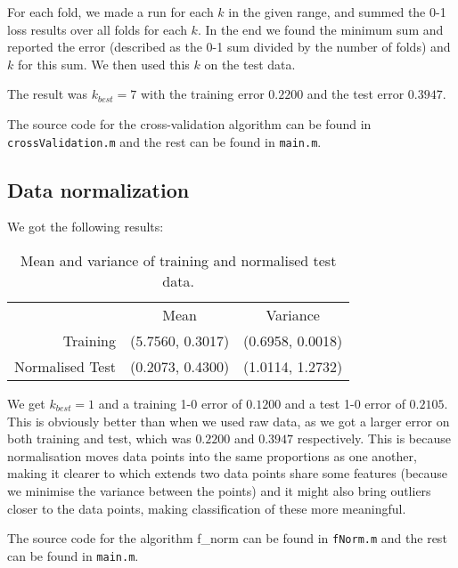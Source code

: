 \documentclass[a4paper, 11pt]{article}
\begin{document}
For each fold, we made a run for each $k$ in the given range, and summed the 0-1 loss results over all folds for each $k$. In the end we found the minimum sum and reported the error (described as the 0-1 sum divided by the number of folds) and $k$ for this sum. We then used this $k$ on the test data.

The result was $k_{best}=7$ with the training error $0.2200$ and the test error $0.3947$. 

The source code for the cross-validation algorithm can be found in \texttt{cross\-Validation.m} and the rest can be found in \texttt{main.m}.

\subsection{Data normalization}
\label{sub:data_normalization}

We got the following results:
\begin{table}[H]
    \centering
    \begin{tabular}{r|c|c}
        & Mean & Variance \\
        Training        & (5.7560, 0.3017) & (0.6958, 0.0018)  \\
        Normalised Test & (0.2073, 0.4300) & (1.0114, 1.2732) 
    \end{tabular}
    \caption{Mean and variance of training and normalised test data.}
    \label{tab:normdata}
\end{table}

We get $k_{best} = 1$ and a training 1-0 error of $0.1200$ and a test 1-0 error of $0.2105$.
This is obviously better than when we used raw data, as we got a larger error on both training and test, which was $0.2200$ and $0.3947$ respectively. This is because normalisation moves data points into the same proportions as one another, making it clearer to which extends two data points share some features (because we minimise the variance between the points) and it might also bring outliers closer to the data points, making classification of these more meaningful.

The source code for the algorithm f\_norm can be found in \texttt{fNorm.m} and the rest can be found in \texttt{main.m}.
\end{document}
